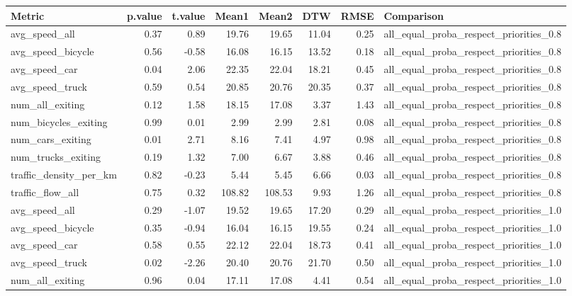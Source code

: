 \begin{table}[ht]
\centering
\begin{tabular}{lrrrrrrl}
  \hline
Metric & p.value & t.value & Mean1 & Mean2 & DTW & RMSE & Comparison \\ 
  \hline
avg\_speed\_all & 0.37 & 0.89 & 19.76 & 19.65 & 11.04 & 0.25 & all\_equal\_proba\_respect\_priorities\_0.8 \\ 
  avg\_speed\_bicycle & 0.56 & -0.58 & 16.08 & 16.15 & 13.52 & 0.18 & all\_equal\_proba\_respect\_priorities\_0.8 \\ 
  avg\_speed\_car & 0.04 & 2.06 & 22.35 & 22.04 & 18.21 & 0.45 & all\_equal\_proba\_respect\_priorities\_0.8 \\ 
  avg\_speed\_truck & 0.59 & 0.54 & 20.85 & 20.76 & 20.35 & 0.37 & all\_equal\_proba\_respect\_priorities\_0.8 \\ 
  num\_all\_exiting & 0.12 & 1.58 & 18.15 & 17.08 & 3.37 & 1.43 & all\_equal\_proba\_respect\_priorities\_0.8 \\ 
  num\_bicycles\_exiting & 0.99 & 0.01 & 2.99 & 2.99 & 2.81 & 0.08 & all\_equal\_proba\_respect\_priorities\_0.8 \\ 
  num\_cars\_exiting & 0.01 & 2.71 & 8.16 & 7.41 & 4.97 & 0.98 & all\_equal\_proba\_respect\_priorities\_0.8 \\ 
  num\_trucks\_exiting & 0.19 & 1.32 & 7.00 & 6.67 & 3.88 & 0.46 & all\_equal\_proba\_respect\_priorities\_0.8 \\ 
  traffic\_density\_per\_km & 0.82 & -0.23 & 5.44 & 5.45 & 6.66 & 0.03 & all\_equal\_proba\_respect\_priorities\_0.8 \\ 
  traffic\_flow\_all & 0.75 & 0.32 & 108.82 & 108.53 & 9.93 & 1.26 & all\_equal\_proba\_respect\_priorities\_0.8 \\ 
  avg\_speed\_all & 0.29 & -1.07 & 19.52 & 19.65 & 17.20 & 0.29 & all\_equal\_proba\_respect\_priorities\_1.0 \\ 
  avg\_speed\_bicycle & 0.35 & -0.94 & 16.04 & 16.15 & 19.55 & 0.24 & all\_equal\_proba\_respect\_priorities\_1.0 \\ 
  avg\_speed\_car & 0.58 & 0.55 & 22.12 & 22.04 & 18.73 & 0.41 & all\_equal\_proba\_respect\_priorities\_1.0 \\ 
  avg\_speed\_truck & 0.02 & -2.26 & 20.40 & 20.76 & 21.70 & 0.50 & all\_equal\_proba\_respect\_priorities\_1.0 \\ 
  num\_all\_exiting & 0.96 & 0.04 & 17.11 & 17.08 & 4.41 & 0.54 & all\_equal\_proba\_respect\_priorities\_1.0 \\ 

\end{tabular}
\end{table}
